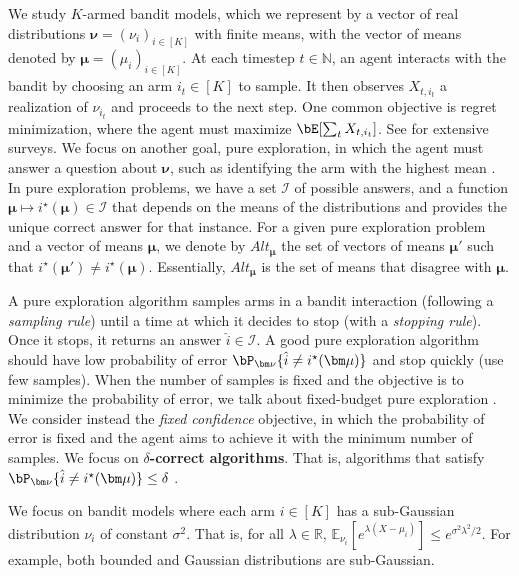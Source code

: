We study $K$-armed bandit models, which we represent by a vector of real distributions $\bm\nu=(\nu_i)_{i\in [K]}$ with finite means, with the vector of means denoted by $\bm\mu=(\mu_i)_{i\in[K]}$. %
At each timestep $t \in \mathbb{N}$, an agent interacts with the bandit by choosing an arm $i_t\in [K]$ to sample.
It then observes $X_{t, i_t}$ a realization of $\nu_{i_t}$ and proceeds to the next step.
One common objective is regret minimization, where the agent must maximize $\bE[\sum_t X_{t, i_t}]$. See \citep{bubeck2012regret,lattimore2020bandit} for extensive surveys.
We focus on another goal, pure exploration, in which the agent must answer a question about $\bm\nu$, such as identifying the arm with the highest mean \citep{even-darPACBoundsMultiarmed2002,kaufmann2016complexity}.
In pure exploration problems, we have a set $\mathcal{I}$ of possible answers, and a function $\bm\mu\mapsto i^\star(\bm\mu)\in\mathcal{I}$ that depends on the means of the distributions and provides the unique correct answer for that instance.
For a given pure exploration problem and a vector of means $\bm\mu$, we denote by $Alt_{\bm \mu}$ the set of vectors of means $\bm{\mu'}$ such that $i^\star(\bm\mu') \ne i^\star(\bm\mu)$. Essentially, $Alt_{\bm\mu}$ is the set of means that disagree with $\bm\mu$. 

A pure exploration algorithm samples arms in a bandit interaction (following a \emph{sampling rule}) until a time at which it decides to stop (with a \emph{stopping rule}). Once it stops, it returns an answer $\hat{i} \in \mathcal I$.
A good pure exploration algorithm should have low probability of error $\bP_{\bm\nu}\{\hat{i}\neq i^\star(\bm\mu)\}$ and stop quickly (use few samples).
When the number of samples is fixed and the objective is to minimize the probability of error, we talk about fixed-budget pure exploration \citep{audibertBestArmIdentification2010}.
We consider instead the \emph{fixed confidence} objective, in which the probability of error is fixed and the agent aims to achieve it with the minimum number of samples.
We focus on \textbf{$\delta$-correct algorithms}. That is, algorithms that satisfy $\bP_{\bm\nu}\{\hat{i}\neq i^\star(\bm\mu)\} \le \delta$ \citep{garivierOptimalBestArm2016}.

We focus on bandit models where each arm $i\in[K]$ has a sub-Gaussian distribution $\nu_i$ of constant $\sigma^2$.
That is, for all $\lambda \in \mathbb{R}$, $\mathbb{E}_{\nu_i}[e^{\lambda (X - \mu_i)}] \le e^{\sigma^2 \lambda^2 / 2}$.
For example, both bounded and Gaussian distributions are sub-Gaussian.


